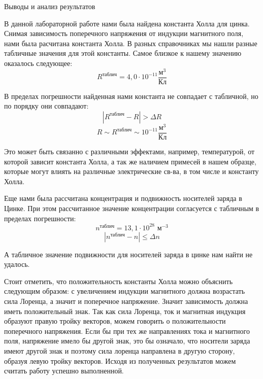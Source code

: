 \documentclass[12pt]{article}
\begin{document}
    \begin{point}{Выводы и анализ результатов}
        \par В данной лабораторной работе нами была найдена константа Холла для цинка. Снимая зависимость поперечного напряжения от индукции магнитного поля, нами была расчитана константа Холла.
        В разных справочниках мы нашли разные табличные значения для этой константы. Самое близкое к нашему значению оказалось следующее:
        \[R^{\text{таблич}} = 4,0 \cdot 10^{-11} \frac{\text{м}^3}{\text{Кл}}\]
        \par В пределах погрешности найденная нами константа не совпадает с табличной, но по порядку они совпадают:
        \[|R^{\text{таблич}} - R| > \Delta R\]
        \[ R \sim R^{\text{таблич}} \sim 10^{-11} \frac{\text{м}^3}{\text{Кл}} \]
        \par Это может быть связанно с различными эффектами, например, температурой, от которой зависит константа Холла, а так же наличием примесей в нашем образце, которые могут влиять на различные электрические св-ва, в том числе и константу Холла.
        \par Еще нами была рассчитана концентрация и подвижность носителей заряда в Цинке.
        При этом рассчитанное значение концентрации согласуется с табличным в пределах погрешности:
        \[ n^{\text{таблич}} = 13,1 \cdot 10^{28} \text{ м}^{-3}\]
        \[ |n^{\text{таблич}} - n| \leq \Delta n \]
        \par А табличное значение подвижности для носителей заряда в цинке нам найти не удалось.
        \par Стоит отметить, что положительность константы Холла можно объяснить следующим образом: с увеличением индукции магнитного должна возрастать сила Лоренца, а значит и поперечное напряжение. Значит зависимость должна иметь положительный знак. Так как сила Лоренца, ток и магнитная индукция образуют правую тройку векторов, можем говорить о положительности поперечного напряжения.
        Если бы при тех же направлениях тока и магнитного поля, напряжение имело бы другой знак, это бы означало, что носители заряда имеют другой знак и поэтому сила лоренца направлена в другую сторону, образуя левую тройку векторов.
        Исходя из полученных результатов можем считать работу успешно выполненной.
    \end{point}
\end{document}
